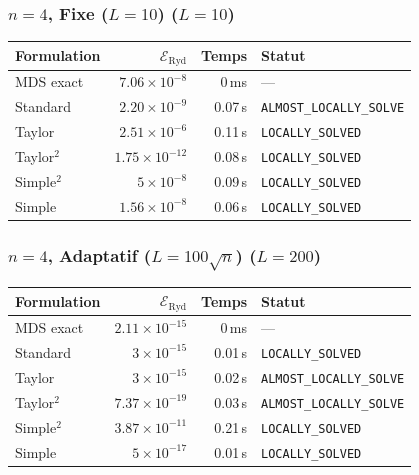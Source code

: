 \subsubsection{$n=4$, Fixe ($L{=}10$) ($L=10$)}
\begin{longtable}{@{}lrrl@{}}
  \toprule
  Formulation & $\mathcal{E}_{\mathrm{Ryd}}$ & Temps & Statut \\
  \midrule
  \endhead
  MDS exact & $7.06\times10^{-8}$ & 0\,ms & --- \\
  Standard & $2.20\times10^{-9}$ & 0.07\,s & \texttt{ALMOST\_LOCALLY\_SOLVE} \\
  Taylor & $2.51\times10^{-6}$ & 0.11\,s & \texttt{LOCALLY\_SOLVED} \\
  Taylor$^2$ & $1.75\times10^{-12}$ & 0.08\,s & \texttt{LOCALLY\_SOLVED} \\
  Simple$^2$ & $5\times10^{-8}$ & 0.09\,s & \texttt{LOCALLY\_SOLVED} \\
  Simple & $1.56\times10^{-8}$ & 0.06\,s & \texttt{LOCALLY\_SOLVED} \\
  \bottomrule
\end{longtable}

\subsubsection{$n=4$, Adaptatif ($L{=}100\sqrt{n}$) ($L=200$)}
\begin{longtable}{@{}lrrl@{}}
  \toprule
  Formulation & $\mathcal{E}_{\mathrm{Ryd}}$ & Temps & Statut \\
  \midrule
  \endhead
  MDS exact & $2.11\times10^{-15}$ & 0\,ms & --- \\
  Standard & $3\times10^{-15}$ & 0.01\,s & \texttt{LOCALLY\_SOLVED} \\
  Taylor & $3\times10^{-15}$ & 0.02\,s & \texttt{ALMOST\_LOCALLY\_SOLVE} \\
  Taylor$^2$ & $7.37\times10^{-19}$ & 0.03\,s & \texttt{ALMOST\_LOCALLY\_SOLVE} \\
  Simple$^2$ & $3.87\times10^{-11}$ & 0.21\,s & \texttt{LOCALLY\_SOLVED} \\
  Simple & $5\times10^{-17}$ & 0.01\,s & \texttt{LOCALLY\_SOLVED} \\
  \bottomrule
\end{longtable}

